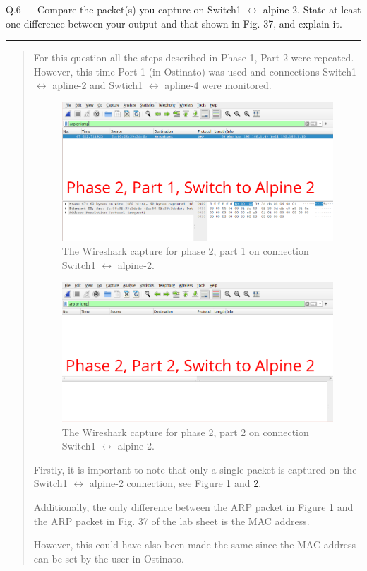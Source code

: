 \documentclass{article}
\newcommand\Que[2]{%
   \begin{samepage}
   \leavevmode\par
   \noindent
   Q.#1 --- #2\par\vspace{10pt}\hrule\vspace{10pt}
   \end{samepage}}
\newenvironment{ans}
   {\fbox{Answer}\begin{quote}\nopagebreak}
   {\end{quote}}
\begin{document}
\Que{6}{Compare the packet(s) you capture on Switch1
$\leftrightarrow$ alpine-2. State at least one difference
between your output and that shown in Fig. 37, and explain it.}

\begin{ans}
For this question all the steps described in Phase 1,
Part 2 were repeated. However, this time Port 1 (in
Ostinato) was used and connections Switch1
$\leftrightarrow$ apline-2 and Swtich1 $\leftrightarrow$
apline-4 were monitored.

\begin{figure}[H]
\centering
\includegraphics[width=14cm]{data/q6-phase2-switch-to-alpine2-part1.png}
\caption{The Wireshark capture for phase 2, part 1 on connection Switch1 $\leftrightarrow$ alpine-2.}
\label{fig:wireshark-phase2-part1-for-q6}
\end{figure}

\begin{figure}[H]
\centering
\includegraphics[width=14cm]{data/q6-phase2-switch-to-alpine2-part2.png}
\caption{The Wireshark capture for phase 2, part 2 on connection Switch1 $\leftrightarrow$ alpine-2.}
\label{fig:wireshark-phase2-part2-for-q6}
\end{figure}

Firstly, it is important to note that only a single packet
is captured on the Switch1 $\leftrightarrow$ alpine-2
connection, see Figure
\ref{fig:wireshark-phase2-part1-for-q6} and
\ref{fig:wireshark-phase2-part2-for-q6}.

Additionally, the only difference between the ARP packet in
Figure \ref{fig:wireshark-phase2-part1-for-q6} and the ARP
packet in Fig. 37 of the lab sheet is the MAC address.

However, this could have also been made the same since the
MAC address can be set by the user in Ostinato.
\end{ans}
\end{document}
